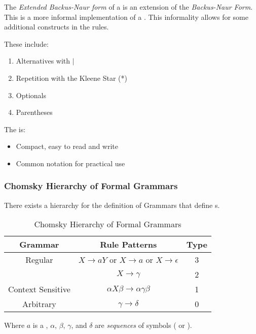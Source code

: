 \begin{definition}\label{def:CFG_EBNF_Form}
  The \emph{Extended Backus-Naur form} of a  is an extension of the \emph{Backus-Naur Form}.
  This is a more informal implementation of a .
  This informality allows for some additional constructs in the  rules.

  These include:
  \begin{enumerate}[noitemsep]
  \item Alternatives with $\vert$
  \item Repetition with the Kleene Star (*)
  \item Optionals
  \item Parentheses
  \end{enumerate}

  The  is:
  \begin{itemize}[noitemsep]
  \item Compact, easy to read and write
  \item Common notation for practical use
  \end{itemize}
\end{definition}

\subsubsection{Chomsky Hierarchy of Formal Grammars}\label{subsubsec:Formal_Grammar_Hierarchy}
There exists a hierarchy for the definition of Grammars that define s.
\begin{table}[h!]
  \centering
  \begin{tabular}{ccc}
    \toprule
    Grammar & Rule Patterns & Type \\
    \midrule
    Regular & $X \rightarrow a Y$ or $X \rightarrow a$ or $X \rightarrow \epsilon$ & 3 \\
    \nameref{def:Context_Free_Grammar} & $X \rightarrow \gamma$ & 2 \\
    Context Sensitive & $\alpha X \beta \rightarrow \alpha \gamma \beta$ & 1 \\
    Arbitrary & $\gamma \rightarrow \delta$ & 0 \\
    \bottomrule
  \end{tabular}
  \caption{Chomsky Hierarchy of Formal Grammars}
  \label{tab:Formal_Grammar_Hierarchy}
\end{table}
Where $a$ is a , $\alpha$, $\beta$, $\gamma$, and $\delta$ are \emph{sequences} of symbols ( or ).

